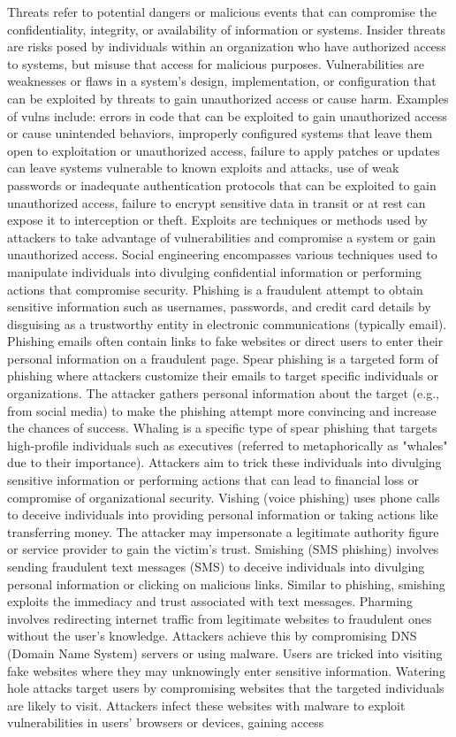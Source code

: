 \documentclass{article}
\begin{document}
	Threats refer to potential dangers or malicious events that can compromise the confidentiality, integrity, or availability of information or systems. Insider threats are risks posed by individuals within an organization who have authorized access to systems, but misuse that access for malicious purposes. Vulnerabilities are weaknesses or flaws in a system's design, implementation, or configuration that can be exploited by threats to gain unauthorized access or cause harm. Examples of vulns include: errors in code that can be exploited to gain unauthorized access or cause unintended behaviors,  improperly configured systems that leave them open to exploitation or unauthorized access, failure to apply patches or updates can leave systems vulnerable to known exploits and attacks, use of weak passwords or inadequate authentication protocols that can be exploited to gain unauthorized access, failure to encrypt sensitive data in transit or at rest can expose it to interception or theft. Exploits are techniques or methods used by attackers to take advantage of vulnerabilities and compromise a system or gain unauthorized access. Social engineering encompasses various techniques used to manipulate individuals into divulging confidential information or performing actions that compromise security. Phishing is a fraudulent attempt to obtain sensitive information such as usernames, passwords, and credit card details by disguising as a trustworthy entity in electronic communications (typically email). Phishing emails often contain links to fake websites or direct users to enter their personal information on a fraudulent page. Spear phishing is a targeted form of phishing where attackers customize their emails to target specific individuals or organizations. The attacker gathers personal information about the target (e.g., from social media) to make the phishing attempt more convincing and increase the chances of success. Whaling is a specific type of spear phishing that targets high-profile individuals such as executives (referred to metaphorically as "whales" due to their importance). Attackers aim to trick these individuals into divulging sensitive information or performing actions that can lead to financial loss or compromise of organizational security. Vishing (voice phishing) uses phone calls to deceive individuals into providing personal information or taking actions like transferring money. The attacker may impersonate a legitimate authority figure or service provider to gain the victim's trust. Smishing (SMS phishing) involves sending fraudulent text messages (SMS) to deceive individuals into divulging personal information or clicking on malicious links. Similar to phishing, smishing exploits the immediacy and trust associated with text messages. Pharming involves redirecting internet traffic from legitimate websites to fraudulent ones without the user's knowledge. Attackers achieve this by compromising DNS (Domain Name System) servers or using malware. Users are tricked into visiting fake websites where they may unknowingly enter sensitive information. Watering hole attacks target users by compromising websites that the targeted individuals are likely to visit. Attackers infect these websites with malware to exploit vulnerabilities in users' browsers or devices, gaining access 
\end{document}
